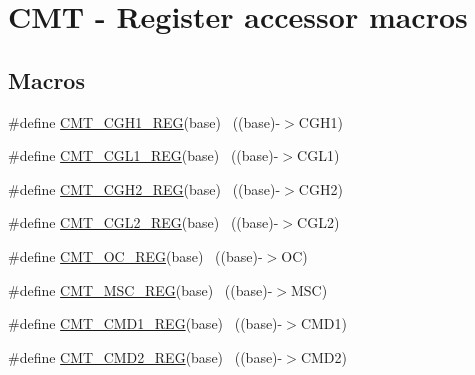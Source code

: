 \hypertarget{group___c_m_t___register___accessor___macros}{}\section{C\+MT -\/ Register accessor macros}
\label{group___c_m_t___register___accessor___macros}
\subsection*{Macros}
\begin{DoxyCompactItemize}
\item 
\#define \hyperlink{group___c_m_t___register___accessor___macros_ga1f00c7e08c77c8d2388cc2f0f819d187}{C\+M\+T\+\_\+\+C\+G\+H1\+\_\+\+R\+EG}(base)                                          ~((base)-\/$>$C\+G\+H1)
\item 
\#define \hyperlink{group___c_m_t___register___accessor___macros_ga771dd48290399c3c4f3b104299e28f66}{C\+M\+T\+\_\+\+C\+G\+L1\+\_\+\+R\+EG}(base)                                          ~((base)-\/$>$C\+G\+L1)
\item 
\#define \hyperlink{group___c_m_t___register___accessor___macros_ga8aeb87a39cf6d86e317a6ddb8340e8fa}{C\+M\+T\+\_\+\+C\+G\+H2\+\_\+\+R\+EG}(base)                                          ~((base)-\/$>$C\+G\+H2)
\item 
\#define \hyperlink{group___c_m_t___register___accessor___macros_gac1baf38413e70d4e3077963d08d67c1a}{C\+M\+T\+\_\+\+C\+G\+L2\+\_\+\+R\+EG}(base)                                          ~((base)-\/$>$C\+G\+L2)
\item 
\#define \hyperlink{group___c_m_t___register___accessor___macros_ga2b29abafd53b2d21c63ac04ca73c8ab3}{C\+M\+T\+\_\+\+O\+C\+\_\+\+R\+EG}(base)                                              ~((base)-\/$>$OC)
\item 
\#define \hyperlink{group___c_m_t___register___accessor___macros_ga8b8f43bd61d3d9b918c86cc17e530a23}{C\+M\+T\+\_\+\+M\+S\+C\+\_\+\+R\+EG}(base)                                            ~((base)-\/$>$M\+SC)
\item 
\#define \hyperlink{group___c_m_t___register___accessor___macros_gaf70e5f0b96785634416451b252de9522}{C\+M\+T\+\_\+\+C\+M\+D1\+\_\+\+R\+EG}(base)                                          ~((base)-\/$>$C\+M\+D1)
\item 
\#define \hyperlink{group___c_m_t___register___accessor___macros_ga52cac578885360a51fb5f8333a32499f}{C\+M\+T\+\_\+\+C\+M\+D2\+\_\+\+R\+EG}(base)                                          ~((base)-\/$>$C\+M\+D2)

\end{DoxyCompactItemize}
